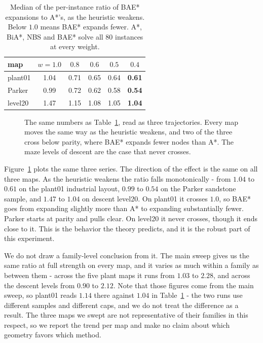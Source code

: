 \documentclass[letterpaper]{article} %
\begin{document}
\begin{table}[t] \centering\small
  \begin{tabular}{lccccc} \toprule map & $w{=}1.0$ & $0.8$ & $0.6$ & $0.5$ & $0.4$ \\ \midrule plant01 & 1.04 & 0.71 & 0.65 & 0.64 & \textbf{0.61} \\ Parker & 0.99 & 0.72 & 0.62 & 0.58 & \textbf{0.54} \\ level20 & 1.47 & 1.15 & 1.08 & 1.05 & \textbf{1.04} \\ \bottomrule
  \end{tabular}
  \caption{Median of the per-instance ratio of BAE* expansions to A*'s, as the heuristic weakens. Below $1.0$ means BAE* expands fewer. A*, BiA*, NBS and BAE* solve all 80 instances at every weight.}\label{tab:xover}
\end{table}

\begin{figure}[t] \centering
  
  \caption{The same numbers as Table~\ref{tab:xover}, read as three trajectories. Every map moves the same way as the heuristic weakens, and two of the three cross below parity, where BAE* expands fewer nodes than A*. The maze levels of descent are the case that never crosses.}\label{fig:xover}
\end{figure}

Figure~\ref{fig:xover} plots the same three series. The direction of the effect is the same on all three maps. As the heuristic weakens the ratio falls monotonically - from $1.04$ to $0.61$ on the plant01 industrial layout, $0.99$ to $0.54$ on the Parker sandstone sample, and $1.47$ to $1.04$ on descent level20. On plant01 it crosses $1.0$, so BAE* goes from expanding slightly more than A* to expanding substantially fewer. Parker starts at parity and pulls clear. On level20 it never crosses, though it ends close to it. This is the behavior the theory predicts, and it is the robust part of this experiment.

We do not draw a family-level conclusion from it. The main sweep gives us the same ratio at full strength on every map, and it varies as much within a family as between them - across the five plant maps it runs from $1.03$ to $2.28$, and across the descent levels from $0.90$ to $2.12$. Note that those figures come from the main sweep, so plant01 reads $1.14$ there against $1.04$ in Table~\ref{tab:xover} - the two runs use different samples and different caps, and we do not treat the difference as a result. The three maps we swept are not representative of their families in this respect, so we report the trend per map and make no claim about which geometry favors which method.
\end{document}
